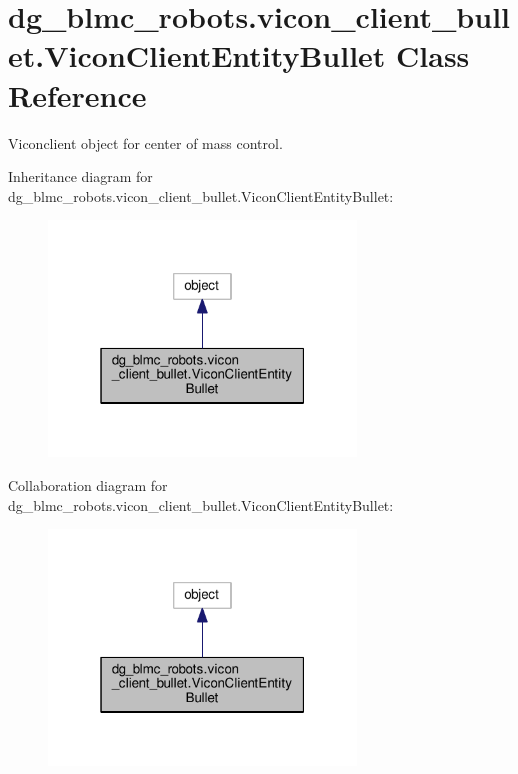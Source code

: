 \hypertarget{classdg__blmc__robots_1_1vicon__client__bullet_1_1ViconClientEntityBullet}{}\section{dg\+\_\+blmc\+\_\+robots.\+vicon\+\_\+client\+\_\+bullet.\+Vicon\+Client\+Entity\+Bullet Class Reference}
\label{classdg__blmc__robots_1_1vicon__client__bullet_1_1ViconClientEntityBullet}


Viconclient object for center of mass control.  




Inheritance diagram for dg\+\_\+blmc\+\_\+robots.\+vicon\+\_\+client\+\_\+bullet.\+Vicon\+Client\+Entity\+Bullet\+:
\nopagebreak
\begin{figure}[H]
\begin{center}
\leavevmode
\includegraphics[width=232pt]{classdg__blmc__robots_1_1vicon__client__bullet_1_1ViconClientEntityBullet__inherit__graph}
\end{center}
\end{figure}


Collaboration diagram for dg\+\_\+blmc\+\_\+robots.\+vicon\+\_\+client\+\_\+bullet.\+Vicon\+Client\+Entity\+Bullet\+:
\nopagebreak
\begin{figure}[H]
\begin{center}
\leavevmode
\includegraphics[width=232pt]{classdg__blmc__robots_1_1vicon__client__bullet_1_1ViconClientEntityBullet__coll__graph}
\end{center}
\end{figure}
